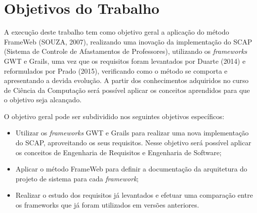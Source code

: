 
\section{Objetivos do Trabalho}
\label{sec-objetivos}


A execução deste trabalho tem como objetivo geral a aplicação do método FrameWeb (SOUZA, 2007), realizando uma inovação da implementação do SCAP (Sistema de Controle de Afastamentos de Professores), utilizando os \textit{frameworks} GWT e Grails, uma vez que os requisitos foram levantados por Duarte (2014) e reformulados por Prado (2015), verificando como o método se comporta e apresentando a devida evolução. A partir dos conhecimentos adquiridos no curso de Ciência da Computação será possível aplicar os conceitos aprendidos para que o objetivo seja alcançado.

O objetivo geral pode ser subdividido nos seguintes objetivos específicos:

\begin{itemize}

	\item Utilizar os \textit{frameworks} GWT e Grails para realizar uma nova implementação do SCAP, aproveitando os seus requisitos. Nesse objetivo será possível aplicar os conceitos de Engenharia de Requisitos e Engenharia de Software;
	\item Aplicar o método FrameWeb para definir a documentação da arquitetura do projeto de sistema para cada \textit{framework};
    \item Realizar o estudo dos requisitos já levantados e efetuar uma comparação entre os frameworks que já foram utilizados em versões anteriores.

\end{itemize}
